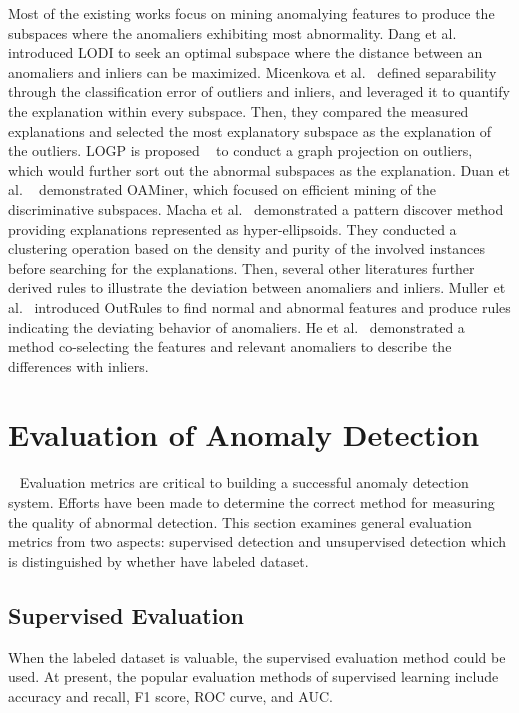 Most of the existing works focus on mining anomalying features to
produce the subspaces where
the anomaliers exhibiting most abnormality.
Dang et al.~\cite{dang2013local} introduced LODI to
seek an optimal subspace where
the distance between an anomaliers and
inliers can be maximized.
Micenkova et al.~\cite{micenkova2013explaining}
defined separability through the classification error of outliers and
inliers,
and leveraged it to
quantify the explanation within every subspace.
Then,
they compared the measured explanations and
selected the most explanatory subspace as the explanation of the outliers.
LOGP is proposed ~\cite{dang2014discriminative}  to
conduct a graph projection on outliers,
which would further sort out the abnormal subspaces as the explanation.
Duan et al. ~\cite{duan2015mining}
demonstrated OAMiner,
which focused on efficient mining of the discriminative subspaces.
Macha et al.~\cite{macha2018explaining}
demonstrated a pattern discover method providing explanations represented as hyper-ellipsoids.
They conducted a clustering operation based on the density and
purity of the involved instances before searching for the explanations.
Then,
several other literatures further derived rules to
illustrate the deviation between anomaliers and
inliers.
Muller et al.~\cite{muller2012outrules}
introduced OutRules to
find normal and abnormal features and
produce rules indicating the deviating behavior of anomaliers.
He et al.~\cite{he2010co}
demonstrated a method co-selecting the features and
relevant anomaliers to
describe the differences with inliers.

\section{Evaluation of Anomaly Detection}~\label{sec:evaluate}
Evaluation metrics are critical to building a 
successful anomaly detection system. 
Efforts have been made to determine the 
correct method for measuring the quality of abnormal detection. 
This section examines general evaluation metrics from two aspects: 
supervised detection
and unsupervised detection which is
distinguished by whether have labeled dataset.

\subsection{Supervised Evaluation}
When the labeled dataset is valuable,
the supervised evaluation method could be used.
At present,
the popular evaluation methods of supervised learning
include accuracy and recall,
F1 score,
ROC curve,
and AUC.

